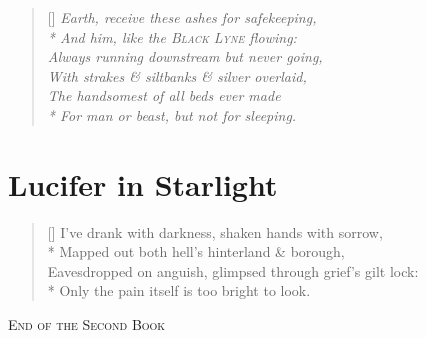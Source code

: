 \documentclass[openany]{amsbook}
\begin{document}
\settowidth{\versewidth}{It felt like it was still summer. We drank}
\begin{verse}[\versewidth]
\it Earth, receive these ashes for safekeeping,\\*
And him, like the \textsc{Black Lyne} flowing:\\
Always running downstream but never going,\\
With strakes \& siltbanks \& silver overlaid,\\
The handsomest of all beds ever made\\*
For man or beast, but not for sleeping.
\end{verse}


\chapter*{Lucifer in Starlight}

\settowidth{\versewidth}{Mapped out both hell's hinterland \& borough,}
\begin{verse}[\versewidth]
I've drank with darkness, shaken hands with sorrow,\\*
Mapped out both hell's hinterland \& borough,\\
Eavesdropped on anguish, glimpsed through grief's gilt lock:\\*
Only the pain itself is too bright to look.
\end{verse}




\bigskip
\bigskip
\begin{center}
\textsc{End of the Second Book}
\end{center}
\end{document}
